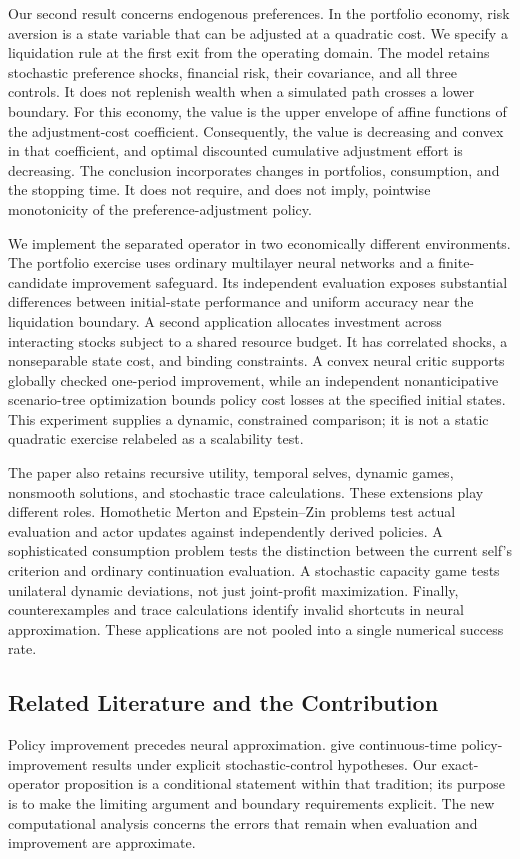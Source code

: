 Our second result concerns endogenous preferences. In the portfolio economy, risk aversion is a state variable that can be adjusted at a quadratic cost. We specify a liquidation rule at the first exit from the operating domain. The model retains stochastic preference shocks, financial risk, their covariance, and all three controls. It does not replenish wealth when a simulated path crosses a lower boundary. For this economy, the value is the upper envelope of affine functions of the adjustment-cost coefficient. Consequently, the value is decreasing and convex in that coefficient, and optimal discounted cumulative adjustment effort is decreasing. The conclusion incorporates changes in portfolios, consumption, and the stopping time. It does not require, and does not imply, pointwise monotonicity of the preference-adjustment policy.

We implement the separated operator in two economically different environments. The portfolio exercise uses ordinary multilayer neural networks and a finite-candidate improvement safeguard. Its independent evaluation exposes substantial differences between initial-state performance and uniform accuracy near the liquidation boundary. A second application allocates investment across interacting stocks subject to a shared resource budget. It has correlated shocks, a nonseparable state cost, and binding constraints. A convex neural critic supports globally checked one-period improvement, while an independent nonanticipative scenario-tree optimization bounds policy cost losses at the specified initial states. This experiment supplies a dynamic, constrained comparison; it is not a static quadratic exercise relabeled as a scalability test.

The paper also retains recursive utility, temporal selves, dynamic games, nonsmooth solutions, and stochastic trace calculations. These extensions play different roles. Homothetic Merton and Epstein--Zin problems test actual evaluation and actor updates against independently derived policies. A sophisticated consumption problem tests the distinction between the current self's criterion and ordinary continuation evaluation. A stochastic capacity game tests unilateral dynamic deviations, not just joint-profit maximization. Finally, counterexamples and trace calculations identify invalid shortcuts in neural approximation. These applications are not pooled into a single numerical success rate.

\subsection{Related Literature and the Contribution}
Policy improvement precedes neural approximation. \citet{jacka2015} give continuous-time policy-improvement results under explicit stochastic-control hypotheses. Our exact-operator proposition is a conditional statement within that tradition; its purpose is to make the limiting argument and boundary requirements explicit. The new computational analysis concerns the errors that remain when evaluation and improvement are approximate.

